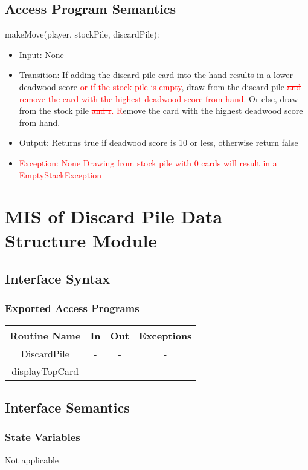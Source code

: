 \documentclass[12pt, titlepage]{article}
\begin{document}
\subsection{Access Program Semantics}
\noindent makeMove(player, stockPile, discardPile):
\begin{itemize}
    \item Input: None 
    \item Transition: If adding the discard pile card into the hand results in a lower deadwood score \textcolor{red}{or if the stock pile is empty}, draw from the discard pile \textcolor{red}{\sout{and remove the card with the highest deadwood score from hand}}. Or else, draw from the stock pile\textcolor{red}{\sout{ and r}. R}emove the card with the highest deadwood score from hand.
    \item Output: Returns true if deadwood score is 10 or less, otherwise return false
    \item \textcolor{red}{Exception: None \sout{Drawing from stock pile with 0 cards will result in a EmptyStackException}}
\end{itemize}

\section{MIS of Discard Pile Data Structure Module}

\subsection{Interface Syntax}
\subsubsection{Exported Access Programs}

\begin{tabular}[pos]{| c | c | c | c |}
    \hline
    \textbf{Routine Name} & \textbf{In} & \textbf{Out} & \textbf{Exceptions}\\
    \hline
    DiscardPile & - & - & - \\
    \hline
    displayTopCard & - & - & -\\
    \hline
\end{tabular}

\subsection{Interface Semantics}
\subsubsection{State Variables}
Not applicable
\end{document}
